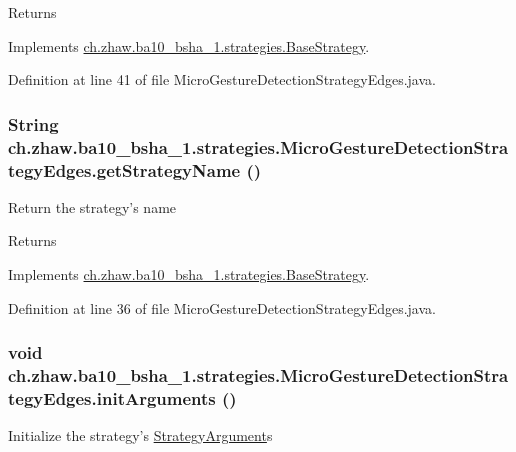 \begin{DoxyReturn}{Returns}

\end{DoxyReturn}


Implements \hyperlink{classch_1_1zhaw_1_1ba10__bsha__1_1_1strategies_1_1BaseStrategy_a75fdb36932ad701f6375cc1fe718056b}{ch.zhaw.ba10\_\-bsha\_\-1.strategies.BaseStrategy}.

Definition at line 41 of file MicroGestureDetectionStrategyEdges.java.\hypertarget{classch_1_1zhaw_1_1ba10__bsha__1_1_1strategies_1_1MicroGestureDetectionStrategyEdges_a7ae8347737b8180278eb34f6d5cbba1d}{
\subsubsection[{getStrategyName}]{\setlength{\rightskip}{0pt plus 5cm}String ch.zhaw.ba10\_\-bsha\_\-1.strategies.MicroGestureDetectionStrategyEdges.getStrategyName ()}}
\label{classch_1_1zhaw_1_1ba10__bsha__1_1_1strategies_1_1MicroGestureDetectionStrategyEdges_a7ae8347737b8180278eb34f6d5cbba1d}
Return the strategy's name

\begin{DoxyReturn}{Returns}

\end{DoxyReturn}


Implements \hyperlink{classch_1_1zhaw_1_1ba10__bsha__1_1_1strategies_1_1BaseStrategy_aa0ebed55eed45409bad13d43a0058780}{ch.zhaw.ba10\_\-bsha\_\-1.strategies.BaseStrategy}.

Definition at line 36 of file MicroGestureDetectionStrategyEdges.java.\hypertarget{classch_1_1zhaw_1_1ba10__bsha__1_1_1strategies_1_1MicroGestureDetectionStrategyEdges_a81df19fe3c91ea915592918c082ceb5d}{
\subsubsection[{initArguments}]{\setlength{\rightskip}{0pt plus 5cm}void ch.zhaw.ba10\_\-bsha\_\-1.strategies.MicroGestureDetectionStrategyEdges.initArguments ()}}
\label{classch_1_1zhaw_1_1ba10__bsha__1_1_1strategies_1_1MicroGestureDetectionStrategyEdges_a81df19fe3c91ea915592918c082ceb5d}
Initialize the strategy's \hyperlink{classch_1_1zhaw_1_1ba10__bsha__1_1_1StrategyArgument}{StrategyArgument}s 

